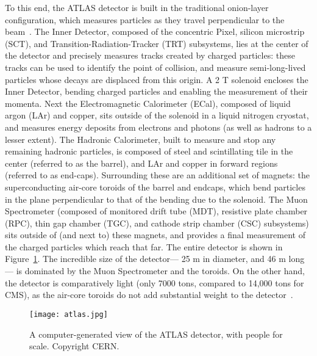 To this end, the ATLAS detector is built in the traditional onion-layer configuration, which measures particles as they travel perpendicular to the beam~\cite{ATLASPaper}. The Inner Detector, composed of the concentric Pixel, silicon microstrip (SCT), and Transition-Radiation-Tracker (TRT) subsystems, lies at the center of the detector and precisely measures tracks created by charged particles: these tracks can be used to identify the point of collision, and measure semi-long-lived particles whose decays are displaced from this origin. A 2 T solenoid encloses the Inner Detector, bending charged particles and enabling the measurement of their momenta. Next the Electromagnetic Calorimeter (ECal), composed of liquid argon (LAr) and copper, sits outside of the solenoid in a liquid nitrogen cryostat, and measures energy deposits from electrons and photons (as well as hadrons to a lesser extent). The Hadronic Calorimeter, built to measure and stop any remaining hadronic particles, is composed of steel and scintillating tile in the center (referred to as the barrel), and LAr and copper in forward regions (referred to as end-caps). Surrounding these are an additional set of magnets: the superconducting air-core toroids of the barrel and endcaps, which bend particles in the plane perpendicular to that of the bending due to the solenoid. The Muon Spectrometer (composed of monitored drift tube (MDT), resistive plate chamber (RPC), thin gap chamber (TGC), and cathode strip chamber (CSC) subsystems) sits outside of (and next to) these magnets, and provides a final measurement of the charged particles which reach that far. The entire detector is shown in Figure~\ref{fig:detector:atlas}. The incredible size of the detector--- 25 m in diameter, and 46 m long--- is dominated by the Muon Spectrometer and the toroids. On the other hand, the detector is comparatively light (only 7000 tons, compared to 14,000 tons for CMS), as the air-core toroids do not add substantial weight to the detector~\cite{CMSPaper,ATLASPaper}.



\begin{figure}
\centering
\texttt{[image: atlas.jpg]}
\caption{A computer-generated view of the ATLAS detector, with people for scale. Copyright CERN.}
\label{fig:detector:atlas}
\end{figure}



